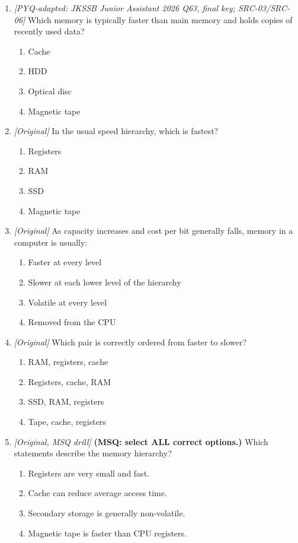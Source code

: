 \begin{enumerate}[label=\textbf{Q\arabic*.}, leftmargin=*]
\begin{enumerate}[label=\Alph*.]
    \item Secondary storage is non-volatile.
    \item ROM is volatile working memory.
  \end{enumerate}
\item \textit{[PYQ-adapted: JKSSB Junior Assistant 2026 Q63, final key; SRC-03/SRC-06]} Which memory is typically faster than main memory and holds copies of recently used data?
  \begin{enumerate}[label=\Alph*.]
\item Cache
   \item HDD
   \item Optical disc
   \item Magnetic tape
  \end{enumerate}

\item \textit{[Original]} In the usual speed hierarchy, which is fastest?
  \begin{enumerate}[label=\Alph*.]
\item Registers
   \item RAM
   \item SSD
   \item Magnetic tape
  \end{enumerate}

\item \textit{[Original]} As capacity increases and cost per bit generally falls, memory in a computer is usually:
  \begin{enumerate}[label=\Alph*.]
\item Faster at every level
   \item Slower at each lower level of the hierarchy
   \item Volatile at every level
   \item Removed from the CPU
  \end{enumerate}

\item \textit{[Original]} Which pair is correctly ordered from faster to slower?
  \begin{enumerate}[label=\Alph*.]
\item RAM, registers, cache
   \item Registers, cache, RAM
   \item SSD, RAM, registers
   \item Tape, cache, registers
  \end{enumerate}

\item \textit{[Original, MSQ drill]} \textbf{(MSQ: select ALL correct options.)} Which statements describe the memory hierarchy?
  \begin{enumerate}[label=\Alph*.]
\item Registers are very small and fast.
   \item Cache can reduce average access time.
   \item Secondary storage is generally non-volatile.
   \item Magnetic tape is faster than CPU registers.
  \end{enumerate}


\end{enumerate}
